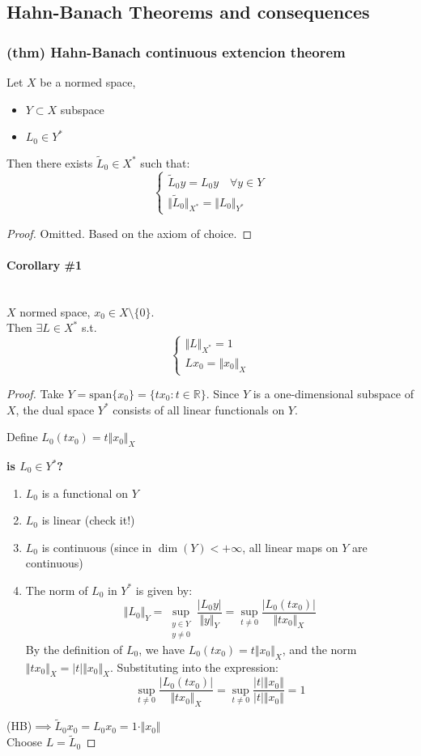 \subsection{Hahn-Banach Theorems and consequences}
\subsubsection{(thm) Hahn-Banach continuous extencion theorem}
Let $X$ be a normed space,
\begin{itemize}
    \item $Y\subset X$ subspace
    \item $L_0\in Y^*$
\end{itemize}
Then there exists $\tilde L_0\in X^*$ such that:
$$\begin{cases}
    \tilde L_0y=L_0y\quad \forall y\in Y\\
    \Vert \tilde L_0\Vert_{X^*}=\Vert L_0\Vert _{Y^*}
\end{cases}$$
\begin{proof}
    Omitted. Based on the axiom of choice.
\end{proof}
\paragraph{Corollary \#1}\ \\
$X$ normed space, $x_0\in X\setminus \{0\}$.\\
Then $\exists L\in X^* $ s.t. 
$$\begin{cases}
    \Vert L\Vert_{X^*}=1\\
    Lx_0=\Vert x_0\Vert _X
\end{cases}$$
\begin{proof}
    Take $Y=\mathrm{span}\{x_0\}=\{tx_0:t\in \mathbb R\}$. Since $Y$ is a one-dimensional subspace of $X$, the dual space $Y^*$ consists of all linear functionals on $Y$. 
    
    Define $L_0(tx_0)=t\Vert x_0\Vert_X$

    
\textbf{    is $L_0\in Y^*$?}    
\begin{enumerate}
        \item $L_0$ is a functional on $Y$
        \item $L_0$ is linear (check it!)
        \item $L_0$ is continuous (since in $\dim(Y)<+\infty$, all linear maps on $Y$ are continuous)
        \item The norm of $L_0$ in $Y^*$ is given by:
        $$\Vert L_0\Vert_Y=\sup_{\substack{y\in Y\\ y\neq 0}}\frac{|L_0y|}{\Vert y\Vert_Y}=\sup_{t \neq 0}\frac{|L_0(tx_0)|}{\Vert tx_0\Vert_X}$$
        By the definition of $L_0$, we have $L_0(tx_0)=t\Vert x_0\Vert_X$, and the norm $\Vert tx_0\Vert_X=|t|\Vert x_0\Vert_X$. Substituting into the expression:
        $$\sup_{t \neq 0}\frac{|L_0(tx_0)|}{\Vert tx_0\Vert_X}=\sup_{t\neq 0} \frac{|t|\Vert x_0\Vert}{|t|\Vert x_0\Vert}=1$$
        
    \end{enumerate}
    (HB)$\implies \tilde L_0x_0=L_0x_0=1\cdot \Vert x_0\Vert $\\
    Choose $L=\tilde L_0$
\end{proof}
